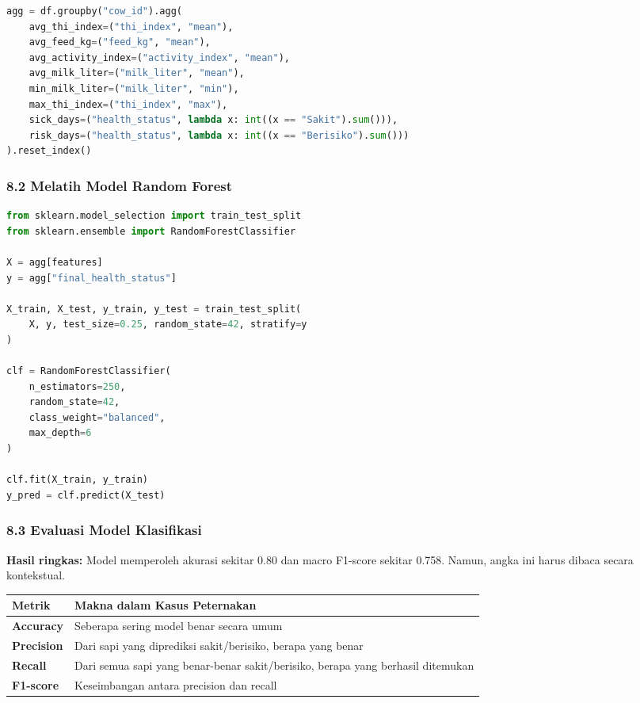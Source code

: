 \documentclass[12pt,a4paper]{article}
\begin{document}
\begin{lstlisting}[language=Python]
agg = df.groupby("cow_id").agg(
    avg_thi_index=("thi_index", "mean"),
    avg_feed_kg=("feed_kg", "mean"),
    avg_activity_index=("activity_index", "mean"),
    avg_milk_liter=("milk_liter", "mean"),
    min_milk_liter=("milk_liter", "min"),
    max_thi_index=("thi_index", "max"),
    sick_days=("health_status", lambda x: int((x == "Sakit").sum())),
    risk_days=("health_status", lambda x: int((x == "Berisiko").sum()))
).reset_index()
\end{lstlisting}

\subsubsection{8.2 Melatih Model Random Forest}

\begin{lstlisting}[language=Python]
from sklearn.model_selection import train_test_split
from sklearn.ensemble import RandomForestClassifier

X = agg[features]
y = agg["final_health_status"]

X_train, X_test, y_train, y_test = train_test_split(
    X, y, test_size=0.25, random_state=42, stratify=y
)

clf = RandomForestClassifier(
    n_estimators=250,
    random_state=42,
    class_weight="balanced",
    max_depth=6
)

clf.fit(X_train, y_train)
y_pred = clf.predict(X_test)
\end{lstlisting}

\subsubsection{8.3 Evaluasi Model Klasifikasi}

\textbf{Hasil ringkas:} Model memperoleh akurasi sekitar 0.80 dan macro F1-score sekitar 0.758. Namun, angka ini harus dibaca secara kontekstual.


\begin{tabular}{|l|l|}
\hline
Metrik & Makna dalam Kasus Peternakan \\
\hline
\textbf{Accuracy} & Seberapa sering model benar secara umum \\
\hline
\textbf{Precision} & Dari sapi yang diprediksi sakit/berisiko, berapa yang benar \\
\hline
\textbf{Recall} & Dari semua sapi yang benar-benar sakit/berisiko, berapa yang berhasil ditemukan \\
\hline
\textbf{F1-score} & Keseimbangan antara precision dan recall \\
\hline
\end{tabular}
\end{document}
